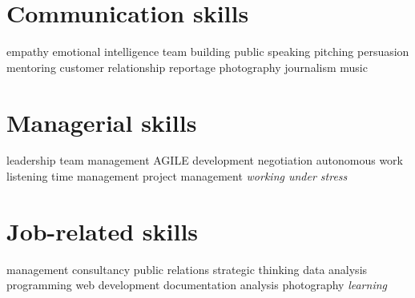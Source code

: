 \documentclass[]{friggeri-cv}
\begin{document}
\begin{aside}
\section{Communication skills}
    empathy
    emotional intelligence
    team building
    public speaking
    pitching
    persuasion
    mentoring
    customer relationship
    reportage
    photography
    journalism
    music
\section{Managerial skills}
    leadership
    team management
    AGILE development
    negotiation
    autonomous work
    listening
    time management
    project management
    \emph{working under stress}
\section{Job-related skills}
    management
    consultancy
    public relations
    strategic thinking
    data analysis
    programming
    web development
    documentation
    analysis
    photography
    \emph{learning}
\end{aside}
\end{document}
